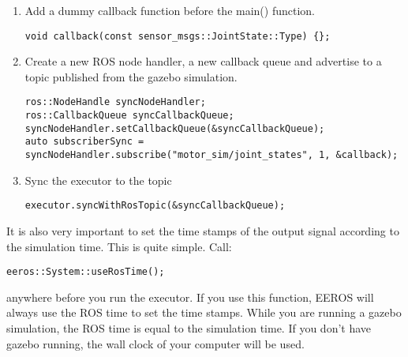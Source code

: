 \begin{enumerate}
\item Add a dummy callback function before the main() function.
\lstset{language=c}
\begin{lstlisting}
void callback(const sensor_msgs::JointState::Type) {};
\end{lstlisting}
\item Create a new ROS node handler, a new callback queue and advertise to a topic published from the gazebo simulation.
\lstset{language=c}
\begin{lstlisting}
ros::NodeHandle syncNodeHandler;
ros::CallbackQueue syncCallbackQueue;
syncNodeHandler.setCallbackQueue(&syncCallbackQueue);
auto subscriberSync = syncNodeHandler.subscribe("motor_sim/joint_states", 1, &callback);
\end{lstlisting}
\item Sync the executor to the topic
\lstset{language=c}
\begin{lstlisting}
executor.syncWithRosTopic(&syncCallbackQueue);
\end{lstlisting}
\end{enumerate}

It is also very important to set the time stamps of the output signal according to the simulation time.
This is quite simple.
Call:
\lstset{language=c}
\begin{lstlisting}
eeros::System::useRosTime();
\end{lstlisting}
anywhere before you run the executor.
If you use this function, EEROS will always use the ROS time to set the time stamps.
While you are running a gazebo simulation, the ROS time is equal to the simulation time.
If you don't have gazebo running, the wall clock of your computer will be used.
